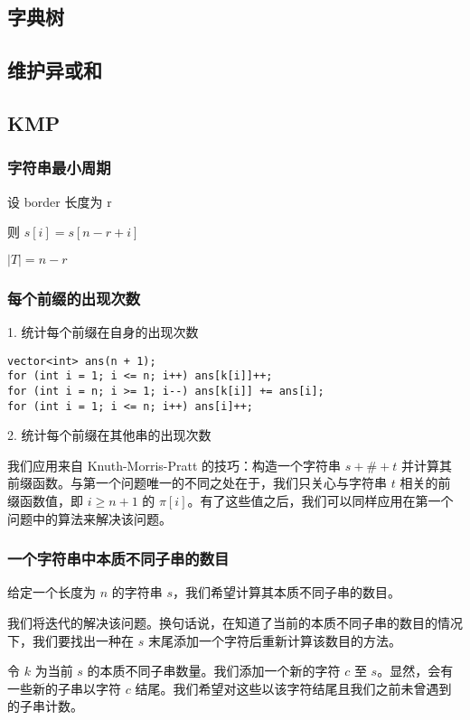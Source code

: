 \documentclass[a4paper]{article}
\begin{document}
\subsection{字典树}
\subsection{维护异或和}

\subsection{KMP}

\subsubsection{字符串最小周期}

设 border 长度为 r

则 $s[i]=s[n-r+i]$

$|T|=n-r$
\subsubsection{每个前缀的出现次数}
1. 统计每个前缀在自身的出现次数
\begin{lstlisting}
vector<int> ans(n + 1);
for (int i = 1; i <= n; i++) ans[k[i]]++;
for (int i = n; i >= 1; i--) ans[k[i]] += ans[i];
for (int i = 1; i <= n; i++) ans[i]++;
\end{lstlisting}

2. 统计每个前缀在其他串的出现次数

我们应用来自 Knuth-Morris-Pratt 的技巧：构造一个字符串 $s + \# + t$ 并计算其前缀函数。与第一个问题唯一的不同之处在于，我们只关心与字符串 $t$ 相关的前缀函数值，即 $i \ge n + 1$ 的 $\pi[i]$。有了这些值之后，我们可以同样应用在第一个问题中的算法来解决该问题。

\subsubsection{一个字符串中本质不同子串的数目}
给定一个长度为 $n$ 的字符串 $s$，我们希望计算其本质不同子串的数目。

我们将迭代的解决该问题。换句话说，在知道了当前的本质不同子串的数目的情况下，我们要找出一种在 $s$ 末尾添加一个字符后重新计算该数目的方法。

令 $k$ 为当前 $s$ 的本质不同子串数量。我们添加一个新的字符 $c$ 至 $s$。显然，会有一些新的子串以字符 $c$ 结尾。我们希望对这些以该字符结尾且我们之前未曾遇到的子串计数。
\end{document}

